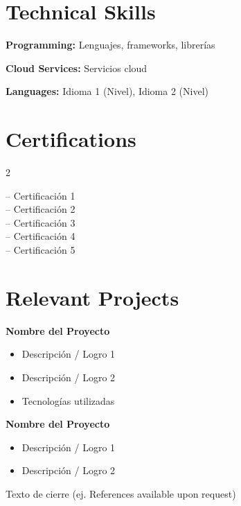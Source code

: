 \documentclass[10pt,a4paper]{article}
\begin{document}
\vspace{-10pt}

\section*{Technical Skills}

\textbf{Programming:} {Lenguajes, frameworks, librerías}

\textbf{Cloud Services:} {Servicios cloud}

\textbf{Languages:} {Idioma 1 (Nivel)}, {Idioma 2 (Nivel)}

\vspace{-10pt}
\section*{Certifications}

\setlength{\multicolsep}{2pt}
\begin{multicols}{2}
\raggedright
-- {Certificación 1}\\
-- {Certificación 2}\\
-- {Certificación 3}\\
-- {Certificación 4}\\
-- {Certificación 5}
\end{multicols}
\vspace{-10pt}

\section*{Relevant Projects}

\textbf{{Nombre del Proyecto}}
\begin{itemize}
    \item {Descripción / Logro 1}
    \item {Descripción / Logro 2}
    \item {Tecnologías utilizadas}
\end{itemize}

\textbf{{Nombre del Proyecto}}
\begin{itemize}
    \item {Descripción / Logro 1}
    \item {Descripción / Logro 2}
\end{itemize}

\vfill
\begin{center}
{Texto de cierre (ej. References available upon request)}
\end{center}

\end{document}
